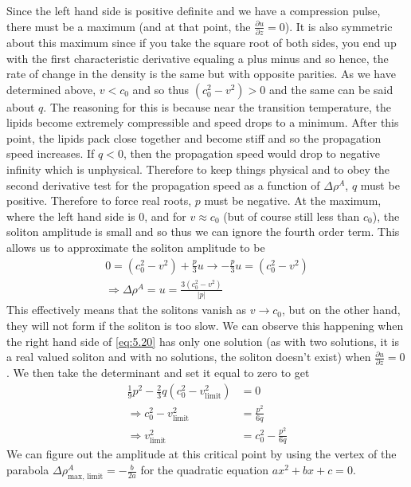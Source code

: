 \documentclass{article}
\newcommand{\pd}[2]{\frac{\partial #1}{\partial #2}}
\numberwithin{equation}{section}
\begin{document}
Since the left hand side is positive definite and we have a compression pulse, there must be a maximum (and at that point, the $\pd{u}{z} = 0$). It is also symmetric about this maximum since if you take the square root of both sides, you end up with the first characteristic derivative equaling a plus minus and so hence, the rate of change in the density is the same but with opposite parities. As we have determined above, $v<c_0$ and so thus $(c_0^2-v^2) >0$ and the same can be said about $q$. The reasoning for this is because near the transition temperature, the lipids become extremely compressible and speed drops to a minimum. After this point, the lipids pack close together and become stiff and so the propagation speed increases. If $q<0$, then the propagation speed would drop to negative infinity which is unphysical. Therefore to keep things physical and to obey the second derivative test for the propagation speed as a function of $\Delta \rho^A$, $q$ must be positive. Therefore to force real roots, $p$ must be negative. At the maximum, where the left hand side is 0, and for $v \approx c_0$ (but of course still less than $c_0$), the soliton amplitude is small and so thus we can ignore the fourth order term. This allows us to approximate the soliton amplitude to be 
\begin{equation}
\begin{split}
    0=(c_0^2-v^2)+\frac{p}{3}u \rightarrow -\frac{p}{3}u=(c_0^2-v^2) \\
    \Rightarrow\Delta\rho^A=u=\frac{3(c_0^2-v^2)}{|p|}
\end{split}    
\end{equation}
This effectively means that the solitons vanish as $v\rightarrow c_0$, but on the other hand, they will not form if the soliton is too slow. We can observe this happening when the right hand side of \eqref{eq:5.20} has only one solution (as with two solutions, it is a real valued soliton and with no solutions, the soliton doesn't exist) when $\pd{u}{z}=0$. We then take the determinant and set it equal to zero to get
\begin{equation}
\begin{split}
    \frac{1}{9}p^2-\frac{2}{3}q(c_0^2-v_{\text{limit}}^2) &=0 \\
    \Rightarrow c_0^2-v_{\text{limit}}^2 &=\frac{p^2}{6q} \\
    \Rightarrow v^2_{\text{limit}} &= c_0^2-\frac{p^2}{6q}
\end{split}
\end{equation}
We can figure out the amplitude at this critical point by using the vertex of the parabola $\Delta \rho^A_{\text{max, limit}} = -\frac{b}{2a}$ for the quadratic equation $ax^2+bx+c=0$.
\end{document}
